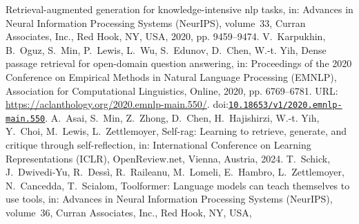 \documentclass[10pt,a4paper]{article}
\providecommand{\bibinfo}[2]{#2}
\providecommand{\DOIprefix}{doi:}
\providecommand{\URLprefix}{URL: }
\providecommand{\doi}[1]{\href{https://doi.org/#1}{\nolinkurl{#1}}}
\begin{document}
\begin{thebibliography}{24}
\newblock \bibinfo{title}{Retrieval-augmented generation for
  knowledge-intensive nlp tasks},
\newblock in: \bibinfo{booktitle}{Advances in Neural Information Processing
  Systems (NeurIPS)}, volume~\bibinfo{volume}{33}, \bibinfo{publisher}{Curran
  Associates, Inc.}, \bibinfo{address}{Red Hook, NY, USA},
  \bibinfo{year}{2020}, pp. \bibinfo{pages}{9459--9474}.
\bibinfo{author}{V.~Karpukhin}, \bibinfo{author}{B.~Oguz},
  \bibinfo{author}{S.~Min}, \bibinfo{author}{P.~Lewis},
  \bibinfo{author}{L.~Wu}, \bibinfo{author}{S.~Edunov},
  \bibinfo{author}{D.~Chen}, \bibinfo{author}{W.-t. Yih},
\newblock \bibinfo{title}{Dense passage retrieval for open-domain question
  answering},
\newblock in: \bibinfo{booktitle}{Proceedings of the 2020 Conference on
  Empirical Methods in Natural Language Processing (EMNLP)},
  \bibinfo{publisher}{Association for Computational Linguistics},
  \bibinfo{address}{Online}, \bibinfo{year}{2020}, pp.
  \bibinfo{pages}{6769--6781}. \URLprefix
  \url{https://aclanthology.org/2020.emnlp-main.550/}.
  \DOIprefix\doi{10.18653/v1/2020.emnlp-main.550}.
\bibinfo{author}{A.~Asai}, \bibinfo{author}{S.~Min},
  \bibinfo{author}{Z.~Zhong}, \bibinfo{author}{D.~Chen},
  \bibinfo{author}{H.~Hajishirzi}, \bibinfo{author}{W.-t. Yih},
  \bibinfo{author}{Y.~Choi}, \bibinfo{author}{M.~Lewis},
  \bibinfo{author}{L.~Zettlemoyer},
\newblock \bibinfo{title}{Self-rag: Learning to retrieve, generate, and
  critique through self-reflection},
\newblock in: \bibinfo{booktitle}{International Conference on Learning
  Representations (ICLR)}, \bibinfo{publisher}{OpenReview.net},
  \bibinfo{address}{Vienna, Austria}, \bibinfo{year}{2024}.
\bibinfo{author}{T.~Schick}, \bibinfo{author}{J.~Dwivedi-Yu},
  \bibinfo{author}{R.~Dess{\`i}}, \bibinfo{author}{R.~Raileanu},
  \bibinfo{author}{M.~Lomeli}, \bibinfo{author}{E.~Hambro},
  \bibinfo{author}{L.~Zettlemoyer}, \bibinfo{author}{N.~Cancedda},
  \bibinfo{author}{T.~Scialom},
\newblock \bibinfo{title}{Toolformer: Language models can teach themselves to
  use tools},
\newblock in: \bibinfo{booktitle}{Advances in Neural Information Processing
  Systems (NeurIPS)}, volume~\bibinfo{volume}{36}, \bibinfo{publisher}{Curran
  Associates, Inc.}, \bibinfo{address}{Red Hook, NY, USA},

\end{thebibliography}
\end{document}
